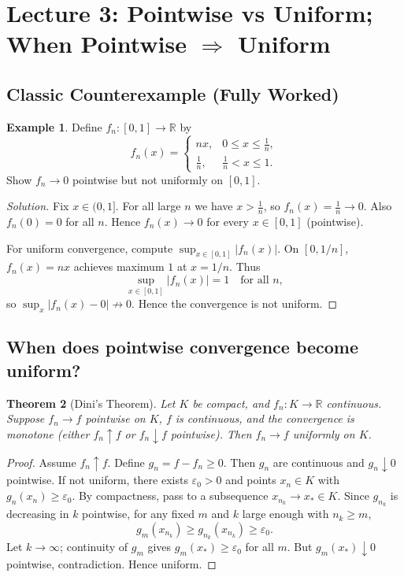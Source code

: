 \documentclass[12pt]{article}
\newtheorem{theorem}{Theorem}[section]
\theoremstyle{definition}
\newtheorem{example}[theorem]{Example}
\begin{document}
\section{Lecture 3: Pointwise vs Uniform; When Pointwise $\Rightarrow$ Uniform}

\subsection{Classic Counterexample (Fully Worked)}

\begin{example}
Define $f_n:[0,1]\to\mathbb{R}$ by
\[
f_n(x)=
\begin{cases}
n x, & 0\le x\le \frac{1}{n},\\[4pt]
\frac{1}{n}, & \frac{1}{n}< x\le 1.
\end{cases}
\]
Show $f_n\to 0$ pointwise but not uniformly on $[0,1]$.
\end{example}

\begin{proof}[Solution]
Fix $x\in(0,1]$. For all large $n$ we have $x>\frac{1}{n}$, so $f_n(x)=\frac{1}{n}\to 0$.
Also $f_n(0)=0$ for all $n$. Hence $f_n(x)\to 0$ for every $x\in[0,1]$ (pointwise).

For uniform convergence, compute $\sup_{x\in[0,1]}|f_n(x)|$.
On $[0,1/n]$, $f_n(x)=nx$ achieves maximum $1$ at $x=1/n$.
Thus
\[
\sup_{x\in[0,1]}|f_n(x)| = 1\quad\text{for all }n,
\]
so $\sup_{x}|f_n(x)-0|\not\to 0$. Hence the convergence is not uniform.
\end{proof}

\subsection{When does pointwise convergence become uniform?}

\begin{theorem}[Dini's Theorem]
Let $K$ be compact, and $f_n:K\to\mathbb{R}$ continuous. Suppose $f_n\to f$ pointwise on $K$,
$f$ is continuous, and the convergence is monotone (either $f_n\uparrow f$ or $f_n\downarrow f$ pointwise).
Then $f_n\to f$ uniformly on $K$.
\end{theorem}

\begin{proof}
Assume $f_n\uparrow f$. Define $g_n=f-f_n\ge 0$. Then $g_n$ are continuous and $g_n\downarrow 0$ pointwise.
If not uniform, there exists $\varepsilon_0>0$ and points $x_n\in K$ with $g_n(x_n)\ge \varepsilon_0$.
By compactness, pass to a subsequence $x_{n_k}\to x_\ast\in K$.
Since $g_{n_k}$ is decreasing in $k$ pointwise, for any fixed $m$ and $k$ large enough with $n_k\ge m$,
\[
g_m(x_{n_k})\ge g_{n_k}(x_{n_k})\ge \varepsilon_0.
\]
Let $k\to\infty$; continuity of $g_m$ gives $g_m(x_\ast)\ge \varepsilon_0$ for all $m$.
But $g_m(x_\ast)\downarrow 0$ pointwise, contradiction. Hence uniform.
\end{proof}
\end{document}
